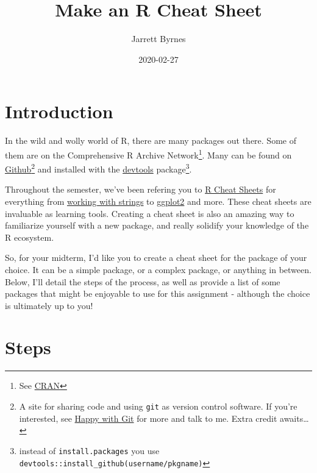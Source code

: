 \documentclass[]{tufte-handout}
\title{Make an R Cheat Sheet}
\author{Jarrett Byrnes}
\date{2020-02-27}
\begin{document}
\maketitle




\hypertarget{introduction}{%
\section{Introduction}\label{introduction}}

In the wild and wolly world of R, there are many packages out there.
Some of them are on the Comprehensive R Archive Network\footnote{See
  \href{https://cran.r-project.org/}{CRAN}}. Many can be found on
\href{http://github.com/}{Github}\footnote{A site for sharing code and
  using \texttt{git} as version control software. If you're interested,
  see \href{https://happygitwithr.com/}{Happy with Git} for more and
  talk to me. Extra credit awaits\ldots{}} and installed with the
\href{https://devtools.r-lib.org/}{devtools} package\footnote{instead of
  \texttt{install.packages} you use
  \texttt{devtools::install\_github(\textquotesingle{}username/pkgname\textquotesingle{})}}.

Throughout the semester, we've been refering you to
\href{https://rstudio.com/resources/cheatsheets/}{R Cheat Sheets} for
everything from
\href{https://github.com/rstudio/cheatsheets/raw/master/strings.pdf}{working
with strings} to
\href{https://github.com/rstudio/cheatsheets/raw/master/data-visualization-2.1.pdf}{ggplot2}
and more. These cheat sheets are invaluable as learning tools. Creating
a cheat sheet is also an amazing way to familiarize yourself with a new
package, and really solidify your knowledge of the R ecosystem.

So, for your midterm, I'd like you to create a cheat sheet for the
package of your choice. It can be a simple package, or a complex
package, or anything in between. Below, I'll detail the steps of the
process, as well as provide a list of some packages that might be
enjoyable to use for this assignment - although the choice is ultimately
up to you!

\hypertarget{steps}{%
\section{Steps}\label{steps}}
\end{document}
